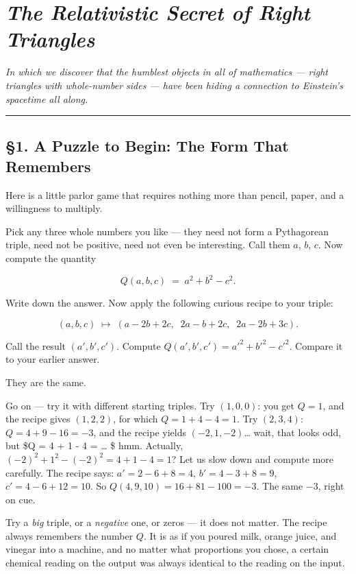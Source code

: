 \chapter{\texorpdfstring{\emph{The Relativistic Secret of Right Triangles}}{The Relativistic Secret of Right Triangles}}
\emph{In which we discover that the humblest objects in all of mathematics --- right triangles with whole-number sides --- have been hiding a connection to Einstein's spacetime all along.}

\bigskip\noindent\rule{\linewidth}{0.4pt}\bigskip

\section{§1. A Puzzle to Begin: The Form That Remembers}
Here is a little parlor game that requires nothing more than pencil, paper, and a willingness to multiply.

Pick any three whole numbers you like --- they need not form a Pythagorean triple, need not be positive, need not even be interesting. Call them \(a\), \(b\), \(c\). Now compute the quantity

\[Q(a, b, c) \;=\; a^2 + b^2 - c^2.\]

Write down the answer. Now apply the following curious recipe to your triple:

\[(a, b, c) \;\longmapsto\; (a - 2b + 2c,\;\; 2a - b + 2c,\;\; 2a - 2b + 3c).\]

Call the result \((a', b', c')\). Compute \(Q(a', b', c') = a'^2 + b'^2 - c'^2\). Compare it to your earlier answer.

They are the same.

Go on --- try it with different starting triples. Try \((1, 0, 0)\): you get \(Q = 1\), and the recipe gives \((1, 2, 2)\), for which \(Q = 1 + 4 - 4 = 1\). Try \((2, 3, 4)\): \(Q = 4 + 9 - 16 = -3\), and the recipe yields \((-2, 1, -2)\)\ldots{} wait, that looks odd, but \$Q = 4 + 1 - 4 = \ldots{} \$ hmm. Actually, \((-2)^2 + 1^2 - (-2)^2 = 4 + 1 - 4 = 1\)? Let us slow down and compute more carefully. The recipe says: \(a' = 2 - 6 + 8 = 4\), \(b' = 4 - 3 + 8 = 9\), \(c' = 4 - 6 + 12 = 10\). So \(Q(4, 9, 10) = 16 + 81 - 100 = -3\). The same \(-3\), right on cue.

Try a \emph{big} triple, or a \emph{negative} one, or zeros --- it does not matter. The recipe always remembers the number \(Q\). It is as if you poured milk, orange juice, and vinegar into a machine, and no matter what proportions you chose, a certain chemical reading on the output was always identical to the reading on the input.


